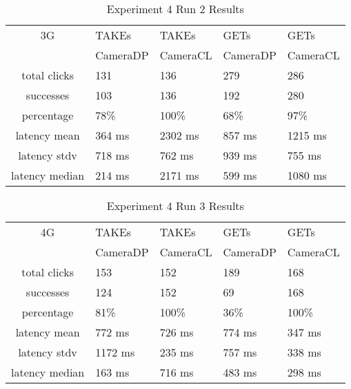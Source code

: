 \begin{table}[htb]
\begin{scriptsize} 
\caption{Experiment 4 Run 2 Results} 
\label{table:exp-4-run2-results}
 \begin{center}
 \begin{tabular}{| c | p{1.5cm} | p{1.5cm} | p{1.5cm} | p{1.4cm} |}
  \hline
  3G & TAKEs & TAKEs & GETs & GETs \\
  & CameraDP & CameraCL & CameraDP & CameraCL \\
  \hline
  total clicks & 131 & 136 & 279 & 286 \\
  \hline
  successes & 103 & 136 & 192 & 280 \\
  \hline
  percentage & 78\% & 100\% & 68\% & 97\% \\
  \hline
  latency mean & 364 ms & 2302 ms & 857 ms & 1215 ms \\
  \hline
  latency stdv & 718 ms & 762 ms & 939 ms & 755 ms \\
  \hline
  latency median & 214 ms & 2171 ms & 599 ms & 1080 ms \\
  \hline
  \end{tabular}

  \end{center}
\end{scriptsize}
\end{table}

\begin{table}[htb]
\begin{scriptsize} 
\caption{Experiment 4 Run 3 Results} 
\label{table:exp-4-run3-results}
 \begin{center}
 \begin{tabular}{| c | p{1.5cm} | p{1.5cm} | p{1.5cm} | p{1.4cm} |}
  \hline
  4G & TAKEs & TAKEs & GETs & GETs \\
  & CameraDP & CameraCL & CameraDP & CameraCL \\
  \hline
  total clicks & 153 & 152 & 189 & 168 \\
  \hline
  successes & 124 & 152 & 69 & 168 \\
  \hline
  percentage & 81\% & 100\% & 36\% & 100\% \\
  \hline
  latency mean & 772 ms & 726 ms & 774 ms & 347 ms \\
  \hline
  latency stdv & 1172 ms & 235 ms & 757 ms & 338 ms \\
  \hline
  latency median & 163 ms & 716 ms & 483 ms & 298 ms \\
  \hline
  \end{tabular}
  \end{center}
\end{scriptsize}
\end{table}

